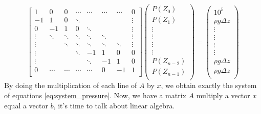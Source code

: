 \begin{equation}
\label{eq:ax_b}
\begin{bmatrix}
   1   &    0   &    0   & \cdots & \cdots & \cdots & \cdots &   0    \\
  -1   &    1   &    0   & \ddots &        &        &        & \vdots \\
   0   &   -1   &    1   &    0   & \ddots &        &        & \vdots \\
\vdots & \ddots & \ddots & \ddots & \ddots & \ddots &        & \vdots \\
\vdots &        & \ddots & \ddots & \ddots & \ddots & \ddots & \vdots \\
\vdots &        &        & \ddots &   -1   &    1   &    0   &   0    \\
\vdots &        &        &        & \ddots &   -1   &    1   &   0    \\
   0   & \cdots & \cdots & \cdots & \cdots &    0   &   -1   &   1    \\
\end{bmatrix}
\begin{pmatrix}
  P(Z_0)  \\
  P(Z_1)  \\
\vdots \\
\vdots \\
\vdots \\
\vdots \\
P(Z_{n-2}) \\
  P(Z_{n-1})  \\
\end{pmatrix}
=
\begin{pmatrix}
 10^5  \\
\rho{}g\Delta{z}     \\
\vdots \\
\vdots \\
\vdots \\
\vdots \\
\rho{}g\Delta{z} \\
\rho{}g\Delta{z}    \\
\end{pmatrix}
\end{equation}
By doing the multiplication of each line of $A$ by $x$, we obtain exactly the system of equations \eqref{eq:system_pressure}.
%
Now, we have a matrix $A$ multiply a vector $x$ equal a vector $b$, it's time to talk about linear algebra.
